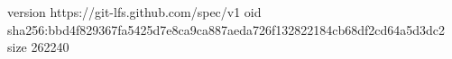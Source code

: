 version https://git-lfs.github.com/spec/v1
oid sha256:bbd4f829367fa5425d7e8ca9ca887aeda726f132822184cb68df2cd64a5d3dc2
size 262240
